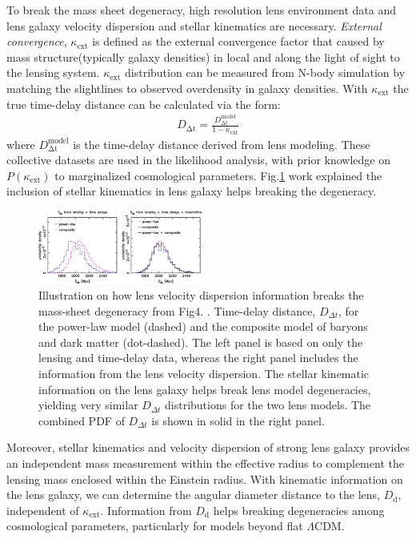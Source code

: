 \documentclass{cosmo}
\begin{document}
    To break the mass sheet degeneracy, high resolution lens environment data and lens galaxy velocity dispersion and stellar kinematics are necessary. \emph{External convergence}, $\kappa_\mathrm{ext}$ is defined as the external convergence factor that caused by mass structure(typically galaxy densities) in local and along the light of sight to the lensing system. $\kappa_\mathrm{ext}$ distribution can be measured from N-body simulation by matching the slightlines to observed overdensity in galaxy densities. With $\kappa_\mathrm{ext}$ the true time-delay distance can be calculated via the form:
    \begin{align*}
       D_\mathrm{\Delta t} = \frac{D^{\mathrm{model}}_\mathrm{\Delta t}}{1-\kappa_\mathrm{ext}}
    \end{align*}
    where $D^{\mathrm{model}}_\mathrm{\Delta t}$ is the time-delay distance derived from lens modeling. These collective datasets are used in the likelihood analysis, with prior knowledge on $P(\kappa_\mathrm{ext})$ to marginalized cosmological parameters. Fig.\ref{fig5} work explained the inclusion of stellar kinematics in lens galaxy helps breaking the degeneracy.
    \begin{figure}[h]
        \centering
        \includegraphics[width=0.48\textwidth]{fig5_2.png}
        \caption{Illustration on how lens velocity dispersion information breaks the mass-sheet degeneracy from Fig4. \cite{Suyu2014}. Time-delay distance, $D_{\Delta t}$, for the power-law model (dashed) and the composite model of baryons and dark matter (dot-dashed). The left panel is based on only the lensing and time-delay data, whereas the right panel includes the information from the lens velocity dispersion. The stellar kinematic information on the lens galaxy helps break lens model degeneracies, yielding very similar $D_{\Delta t}$ distributions for the two lens models. The combined PDF of $D_{\Delta t}$ is shown in solid in the right panel.}
        \label{fig5}
    \end{figure}
    Moreover, stellar kinematics and velocity dispersion of strong lens galaxy provides an independent mass measurement within the effective radius to complement the lensing mass enclosed within the Einstein radius. With kinematic information on the lens galaxy, we can determine the angular diameter distance to the
    lens, $D_\mathrm{d}$, independent of $\kappa_\mathrm{ext}$. Information from $D_\mathrm{d}$ helps breaking degeneracies
    among cosmological parameters, particularly for models beyond flat $\Lambda$CDM.
    
\end{document}
